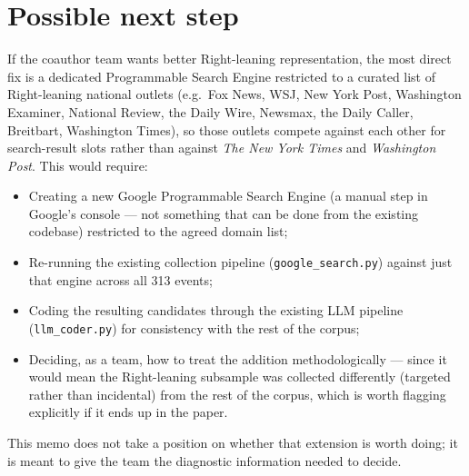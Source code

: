 \documentclass[12pt]{article}
\begin{document}
\section*{Possible next step}

If the coauthor team wants better Right-leaning representation, the
most direct fix is a dedicated Programmable Search Engine restricted
to a curated list of Right-leaning national outlets (e.g.\ Fox News,
WSJ, New York Post, Washington Examiner, National Review, the Daily
Wire, Newsmax, the Daily Caller, Breitbart, Washington Times), so those
outlets compete against each other for search-result slots rather than
against \emph{The New York Times} and \emph{Washington Post}. This
would require:

\begin{itemize}
  \item Creating a new Google Programmable Search Engine (a manual
  step in Google's console --- not something that can be done from the
  existing codebase) restricted to the agreed domain list;
  \item Re-running the existing collection pipeline
  (\texttt{google\_search.py}) against just that engine across all 313
  events;
  \item Coding the resulting candidates through the existing LLM
  pipeline (\texttt{llm\_coder.py}) for consistency with the rest of
  the corpus;
  \item Deciding, as a team, how to treat the addition methodologically
  --- since it would mean the Right-leaning subsample was collected
  differently (targeted rather than incidental) from the rest of the
  corpus, which is worth flagging explicitly if it ends up in the
  paper.
\end{itemize}

This memo does not take a position on whether that extension is worth
doing; it is meant to give the team the diagnostic information needed
to decide.
\end{document}
